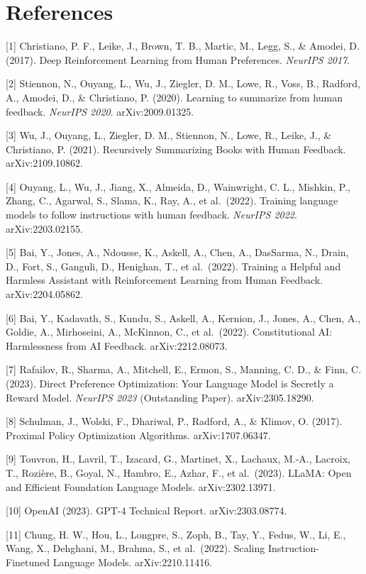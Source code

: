 \section{References}\label{references}

{[}1{]} Christiano, P. F., Leike, J., Brown, T. B., Martic, M., Legg, S., \& Amodei, D. (2017). Deep Reinforcement Learning from Human Preferences. \emph{NeurIPS 2017}.

{[}2{]} Stiennon, N., Ouyang, L., Wu, J., Ziegler, D. M., Lowe, R., Voss, B., Radford, A., Amodei, D., \& Christiano, P. (2020). Learning to summarize from human feedback. \emph{NeurIPS 2020}. arXiv:2009.01325.

{[}3{]} Wu, J., Ouyang, L., Ziegler, D. M., Stiennon, N., Lowe, R., Leike, J., \& Christiano, P. (2021). Recursively Summarizing Books with Human Feedback. arXiv:2109.10862.

{[}4{]} Ouyang, L., Wu, J., Jiang, X., Almeida, D., Wainwright, C. L., Mishkin, P., Zhang, C., Agarwal, S., Slama, K., Ray, A., et al.~(2022). Training language models to follow instructions with human feedback. \emph{NeurIPS 2022}. arXiv:2203.02155.

{[}5{]} Bai, Y., Jones, A., Ndousse, K., Askell, A., Chen, A., DasSarma, N., Drain, D., Fort, S., Ganguli, D., Henighan, T., et al.~(2022). Training a Helpful and Harmless Assistant with Reinforcement Learning from Human Feedback. arXiv:2204.05862.

{[}6{]} Bai, Y., Kadavath, S., Kundu, S., Askell, A., Kernion, J., Jones, A., Chen, A., Goldie, A., Mirhoseini, A., McKinnon, C., et al.~(2022). Constitutional AI: Harmlessness from AI Feedback. arXiv:2212.08073.

{[}7{]} Rafailov, R., Sharma, A., Mitchell, E., Ermon, S., Manning, C. D., \& Finn, C. (2023). Direct Preference Optimization: Your Language Model is Secretly a Reward Model. \emph{NeurIPS 2023} (Outstanding Paper). arXiv:2305.18290.

{[}8{]} Schulman, J., Wolski, F., Dhariwal, P., Radford, A., \& Klimov, O. (2017). Proximal Policy Optimization Algorithms. arXiv:1707.06347.

{[}9{]} Touvron, H., Lavril, T., Izacard, G., Martinet, X., Lachaux, M.-A., Lacroix, T., Rozière, B., Goyal, N., Hambro, E., Azhar, F., et al.~(2023). LLaMA: Open and Efficient Foundation Language Models. arXiv:2302.13971.

{[}10{]} OpenAI (2023). GPT-4 Technical Report. arXiv:2303.08774.

{[}11{]} Chung, H. W., Hou, L., Longpre, S., Zoph, B., Tay, Y., Fedus, W., Li, E., Wang, X., Dehghani, M., Brahma, S., et al.~(2022). Scaling Instruction-Finetuned Language Models. arXiv:2210.11416.


